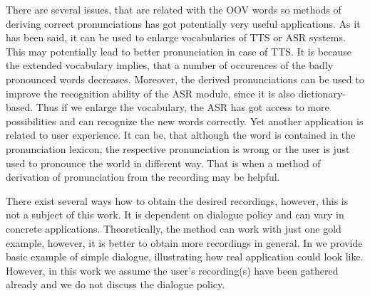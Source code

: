 There are several issues, that are related with the OOV words so methods of deriving correct pronunciations has got potentially very useful applications.
As it has been said, it can be used to enlarge vocabularies of TTS or ASR systems.
This may potentially lead to better pronunciation in case of TTS.
It is because the extended vocabulary implies, that a number of occurences of the badly pronounced words decreases.
Moreover, the derived pronunciations can be used to improve the recognition ability of the ASR module, since it is also dictionary-based.
Thus if we enlarge the vocabulary, the ASR has got access to more possibilities and can recognize the new words correctly.
Yet another application is related to user experience. It can be, that although the word is contained in the pronunciation lexicon, the respective pronunciation is wrong or the user is just used to pronounce the world in different way.
That is when a method of derivation of pronunciation from the recording may be helpful.
\par
There exist several ways how to obtain the desired recordings, however, this is not a subject of this work.
It is dependent on dialogue policy and can vary in concrete applications.
Theoretically, the method can work with just one gold example, however, it is better to obtain more recordings in general.
In  we provide basic example of simple dialogue, illustrating how real application could look like.
However, in this work we assume the user's recording(s) have been gathered already and we do not discuss the dialogue policy.
